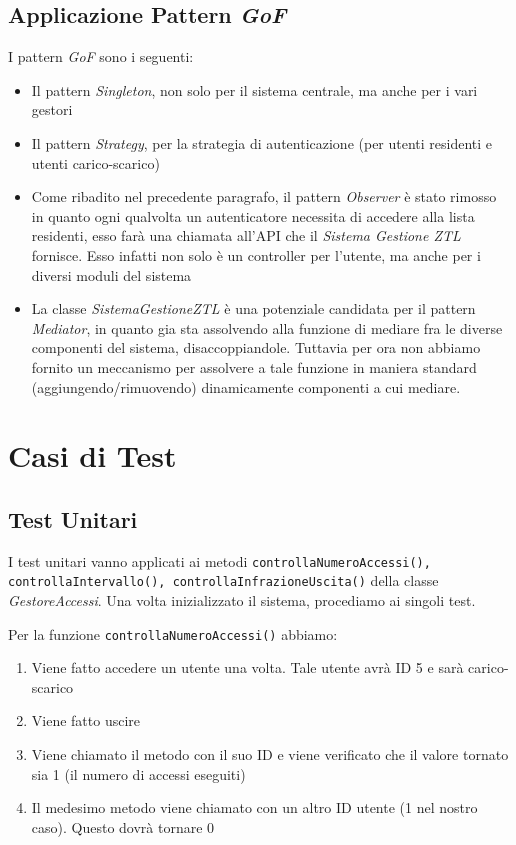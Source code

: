 \documentclass[12pt, letterpaper]{article}
\begin{document}
\subsection{Applicazione Pattern \emph{GoF}}
I pattern \emph{GoF} sono i seguenti:
\begin{itemize}
    \item Il pattern \emph{Singleton}, non 
    solo per il sistema centrale, ma anche 
    per i vari gestori
    \item Il pattern \emph{Strategy}, per la 
    strategia di autenticazione (per utenti 
    residenti e utenti carico-scarico)
    \item Come ribadito nel precedente paragrafo,
    il pattern \emph{Observer} è stato rimosso 
    in quanto ogni qualvolta un autenticatore 
    necessita di accedere alla lista residenti,
    esso farà una chiamata all'API che il 
    \emph{Sistema Gestione ZTL} fornisce.
    Esso infatti non solo è un controller per 
    l'utente, ma anche per i diversi moduli del 
    sistema
    \item La classe \emph{SistemaGestioneZTL} è
    una potenziale candidata per il pattern 
    \emph{Mediator}, in quanto gia sta assolvendo 
    alla funzione di mediare fra le diverse 
    componenti del sistema, disaccoppiandole.
    Tuttavia per ora non abbiamo fornito un 
    meccanismo per assolvere a tale funzione 
    in maniera standard (aggiungendo/rimuovendo)
    dinamicamente componenti a cui mediare.
\end{itemize}

\section{Casi di Test}

\subsection{Test Unitari}
I test unitari vanno applicati ai metodi
\texttt{controllaNumeroAccessi(), 
controllaIntervallo(), controllaInfrazioneUscita()} 
della classe \emph{GestoreAccessi}. Una volta 
inizializzato il sistema, procediamo ai 
singoli test.

\noindent
Per la funzione \texttt{controllaNumeroAccessi()}
abbiamo:

\begin{enumerate}
    \item Viene fatto accedere un utente una volta.
    Tale utente avrà ID 5 e sarà carico-scarico 
    \item Viene fatto uscire 
    \item Viene chiamato il metodo con il suo ID
    e viene verificato che il valore tornato sia 
    1 (il numero di accessi eseguiti)
    \item Il medesimo metodo viene chiamato con 
    un altro ID utente (1 nel nostro caso). Questo 
    dovrà tornare 0
\end{enumerate}
\end{document}
